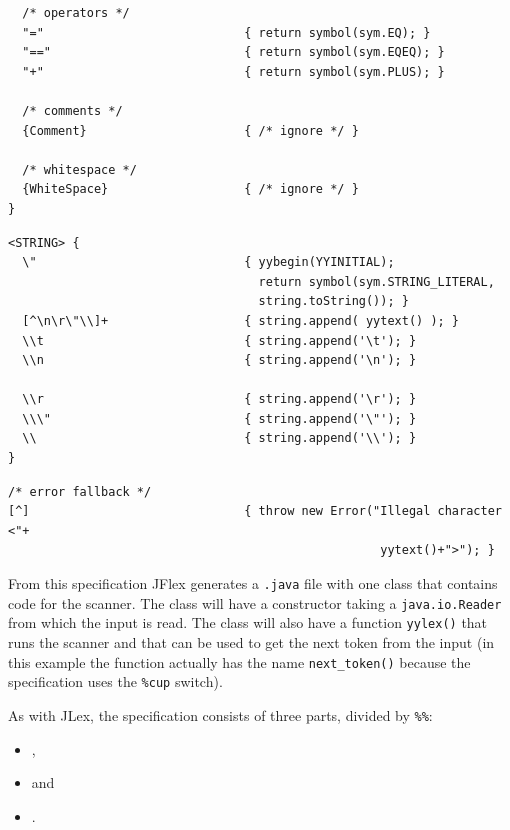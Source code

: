 \documentclass[11pt]{scrartcl}
\begin{document}
{\begin{verbatim}
  /* operators */
  "="                            { return symbol(sym.EQ); }
  "=="                           { return symbol(sym.EQEQ); }
  "+"                            { return symbol(sym.PLUS); }

  /* comments */
  {Comment}                      { /* ignore */ }
 
  /* whitespace */
  {WhiteSpace}                   { /* ignore */ }
}
\end{verbatim}
\label{CodeRulesYYtext}\begin{verbatim}
<STRING> {
  \"                             { yybegin(YYINITIAL); 
                                   return symbol(sym.STRING_LITERAL, 
                                   string.toString()); }
  [^\n\r\"\\]+                   { string.append( yytext() ); }
  \\t                            { string.append('\t'); }
  \\n                            { string.append('\n'); }

  \\r                            { string.append('\r'); }
  \\\"                           { string.append('\"'); }
  \\                             { string.append('\\'); }
}
\end{verbatim}
\label{CodeRulesAllStates}\begin{verbatim}
/* error fallback */
[^]                              { throw new Error("Illegal character <"+
                                                    yytext()+">"); }
\end{verbatim}
}

From this specification JFlex generates a \texttt{.java} file with one
class that contains code for the scanner. The class will have a
constructor taking a \texttt{java.io.Reader} from which the input is
read. The class will also have a function \texttt{yylex()} that runs the
scanner and that can be used to get the next token from the input (in this
example the function actually has the name \texttt{next\_token()} because
the specification uses the \texttt{\%cup} switch).

As with JLex, the specification consists of three parts, divided by \texttt{\%\%}:
\begin{itemize}
\item {},
\item {} and 
\item {}.
\end{itemize}
\end{document}
